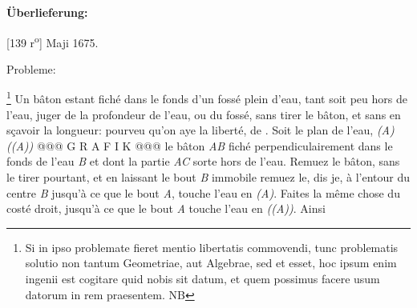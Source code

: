       
               
                \begin{ledgroupsized}[r]{120mm}
                \footnotesize 
                \pstart                
                \noindent\textbf{\"{U}berlieferung:}   
                \pend
                \end{ledgroupsized}
            
              
                            \begin{ledgroupsized}[r]{114mm}
                            \footnotesize 
                            \pstart \parindent -6mm
                            \makebox[6mm][l]{\textit{}} \pend
                            \end{ledgroupsized}
                \vspace*{8mm}
                \pstart 
                \normalsize
            [139 r\textsuperscript{o}] Maji 1675.   \begin{center}Probleme:\end{center}\footnote{ Si in ipso  problemate  fieret mentio  libertatis commovendi,  tunc problematis solutio  non tantum Geometriae, aut Algebrae,  sed et  esset, hoc  ipsum enim ingenii est cogitare  quid nobis sit datum, et quem  possimus facere usum datorum in rem praesentem. NB } \pend \pstart  Un bâton estant fich\'{e}  dans le fonds d'un foss\'{e} plein  d'eau,   tant soit peu hors de l'eau,  juger de la profondeur de  l'eau, ou du foss\'{e}, sans  tirer le bâton, et  sans en s\c{c}avoir la  longueur: pourveu  qu'on aye la libert\'{e}, de . \pend \pstart  Soit le plan de l'eau, \textit{(A)((A))} @@@ G R A F I K @@@%
                      le bâton \textit{AB} fich\'{e} perpendiculairement dans le fonds  de l'eau \textit{B} et dont la partie \textit{AC} sorte hors de l'eau.  Remuez le bâton, sans le  tirer pourtant, et en  laissant le bout \textit{B} immobile  remuez le, dis je, \`{a} l'entour  du centre \textit{B}  jusqu'\`{a} ce  que le bout \textit{A}, touche  l'eau en \textit{(A)}. Faites  la même chose du cost\'{e} droit,  jusqu'\`{a} ce que le bout \textit{A} touche  l'eau en \textit{((A))}. Ainsi